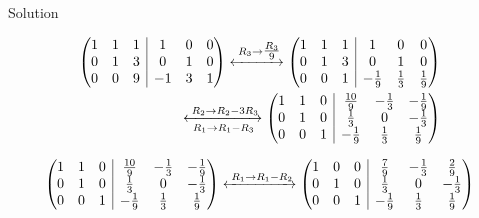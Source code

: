 \documentclass{beamer}
\makeatletter
\numberwithin{equation}{section}
\theoremstyle{remark}
\newenvironment{amatrix}[1]{%
  \left(\begin{array}{@{}*{#1}{c}|*{#1}{c}@{}}
}{%
  \end{array}\right)
}
\newcommand{\myaugvec}[2]{\ensuremath{\begin{amatrix}{#1}#2\end{amatrix}}}
\makeatother
\begin{document}
\begin{frame}{Solution}

\begin{align}
\myaugvec{3}{1 & 1 & 1 & 1 & 0 & 0\\0 & 1 & 3 & 0 & 1 & 0\\0 & 0 & 9 & -1 & 3 & 1 }
\xleftrightarrow{\;R_3 \to \tfrac{R_3}{9}}
\myaugvec{3}{1 & 1 & 1 & 1 & 0 & 0\\0 & 1 & 3 & 0 & 1 & 0\\0 & 0 & 1 & -\tfrac{1}{9} & \tfrac{1}{3} & \tfrac{1}{9} }\\
\xleftrightarrow[\;R_1 \to R_1 - R_3\;]{\;R_2 \to R_2 - 3R_3}
\myaugvec{3}{1 & 1 & 0 & \tfrac{10}{9} & -\tfrac{1}{3} & -\tfrac{1}{9}\\0 & 1 & 0 & \tfrac{1}{3} & 0 & -\tfrac{1}{3}\\0 & 0 & 1 & -\tfrac{1}{9} & \tfrac{1}{3} & \tfrac{1}{9} }
\end{align}

\begin{align}
\myaugvec{3}{1 & 1 & 0 & \tfrac{10}{9} & -\tfrac{1}{3} & -\tfrac{1}{9}\\0 & 1 & 0 & \tfrac{1}{3} & 0 & -\tfrac{1}{3}\\0 & 0 & 1 & -\tfrac{1}{9} & \tfrac{1}{3} & \tfrac{1}{9} }
\xleftrightarrow{\;R_1 \to R_1 - R_2}
\myaugvec{3}{1 & 0 & 0 & \tfrac{7}{9} & -\tfrac{1}{3} & \tfrac{2}{9}\\0 & 1 & 0 & \tfrac{1}{3} & 0 & -\tfrac{1}{3}\\0 & 0 & 1 & -\tfrac{1}{9} & \tfrac{1}{3} & \tfrac{1}{9} }
\end{align}

\end{frame}
\end{document}
